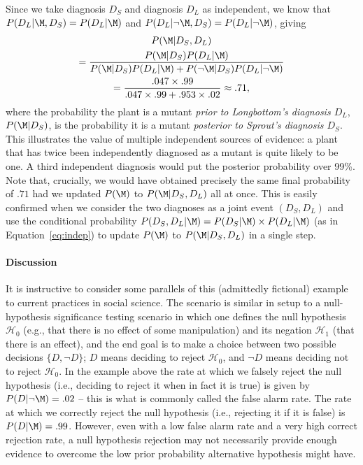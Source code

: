 Since we take diagnosis $D_S$ and diagnosis $D_L$ as  independent, we know that $P(D_L|\M,D_S)=P(D_L|\M)$ and $P(D_L|\neg \M,D_S)=P(D_L|\neg \M)$, giving
\begin{multline*}
P(\M|D_S, D_L) \\
= \frac{P(\M|D_S)P(D_L|\M)}{P(\M|D_S)P(D_L|\M) + P(\neg \M|D_S)P(D_L|\neg \M)} \\
= \frac{.047 \times .99}{.047 \times .99 + .953\times .02} \approx .71,
\end{multline*}
where the probability the plant is a mutant \textit{prior to Longbottom's diagnosis $D_L$}, $P(\M|D_S)$, is the probability it is a mutant \textit{posterior to Sprout's diagnosis $D_S$}. This illustrates the value of multiple independent sources of evidence: a plant that has twice been independently diagnosed as a mutant is quite likely to be one. A third independent diagnosis would put the posterior probability over 99\%. {Note that, crucially, we would have obtained precisely the same final probability of $.71$ had we updated $P(\M)$ to $P(\M|D_S,D_L)$ all at once. This is easily confirmed when we consider the two diagnoses as a joint event $(D_S,D_L)$ and use the conditional probability $P(D_S,D_L|\M) = P(D_S | \M) \times P(D_L | \M)$ (as in Equation~\ref{eq:indep}) to update $P(\M)$ to $P(\M|D_S,D_L)$ in a single step.}

\paragraph{Discussion} 
It is instructive to consider some parallels of this (admittedly fictional) example to current practices in social science. The scenario is similar in setup to a null-hypothesis significance testing scenario in which one defines the null hypothesis $\mathcal{H}_0$ (e.g., that there is no effect of some manipulation) and its negation $\mathcal{H}_1$ (that there is an effect), and the end goal is to make a choice between two possible decisions $\{D,\neg D\}$; $D$ means deciding to reject $\mathcal{H}_0$, and $\neg D$ means deciding not to reject $\mathcal{H}_0$. {In the example above the} rate at which we falsely reject the null hypothesis (i.e., deciding to reject it when in fact it is true) is given by $P(D|\neg\M) = .02$ -- this is what is commonly called the false alarm rate. The rate at which we correctly reject the null hypothesis (i.e., rejecting it if it is false) is $P(D|\M) = .99$. However, even with a {low false alarm rate and a very high correct rejection rate}, a null hypothesis rejection may not necessarily provide enough evidence to overcome the low prior probability  alternative hypothesis {might have}.

